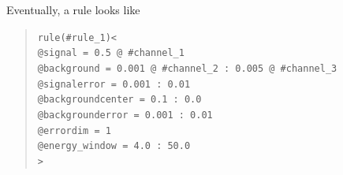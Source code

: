 Eventually, a rule looks like
\begin{quote}
{\tt rule(\#rule\_1)<\\
\tb @signal = 0.5 @ \#channel\_1\\
\tb @background = 0.001 @ \#channel\_2 :  0.005 @ \#channel\_3\\
\tb @signalerror =       0.001  :       0.01\\
\tb @backgroundcenter =  0.1 :       0.0\\
\tb @backgrounderror =   0.001 :       0.01\\
\tb @errordim = 1\\
\tb @energy\_window = 4.0 : 50.0\\ 
>}
\end{quote}




